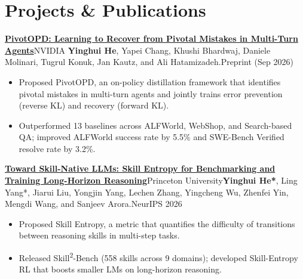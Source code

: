 \documentclass[a4paper,11pt]{article}
\begin{document}
\section{\textbf{Projects \& Publications}}
\vspace{0.2mm}
\small{
\vspace{0.5mm}
\resumePublication
{\href{https://arxiv.org/abs/2609.40285}{\textbf{PivotOPD: Learning to Recover from Pivotal Mistakes in Multi-Turn Agents}}}{NVIDIA}
{\textbf{Yinghui He}, Yapei Chang, Khushi Bhardwaj, Daniele Molinari, Tugrul Konuk, Jan Kautz, and Ali Hatamizadeh.}{Preprint (Sep 2026)}

\begin{itemize}[leftmargin=*, itemsep=0.2mm]
  \item Proposed PivotOPD, an on-policy distillation framework that identifies pivotal mistakes in multi-turn agents and jointly trains error prevention (reverse KL) and recovery (forward KL).
  \item Outperformed 13 baselines across ALFWorld, WebShop, and Search-based QA; improved ALFWorld success rate by 5.5\% and SWE-Bench Verified resolve rate by 3.2\%.
\end{itemize}

\resumePublication
{\href{https://arxiv.org/abs/2608.05139}{\textbf{Toward Skill-Native LLMs: Skill Entropy for Benchmarking and Training Long-Horizon Reasoning}}}{Princeton University}{\textbf{Yinghui He*}, Ling Yang*, Jiarui Liu, Yongjin Yang, Lechen Zhang, Yingcheng Wu, Zhenfei Yin, Mengdi Wang, and Sanjeev Arora.}{NeurIPS 2026}

\begin{itemize}[leftmargin=*, itemsep=0.2mm]
  \item Proposed Skill Entropy, a metric that quantifies the difficulty of transitions between reasoning skills in multi-step tasks.
  \item Released Skill\textsuperscript{2}-Bench (558 skills across 9 domains); developed Skill-Entropy RL that boosts smaller LMs on long-horizon reasoning.
\end{itemize}



}
\end{document}
